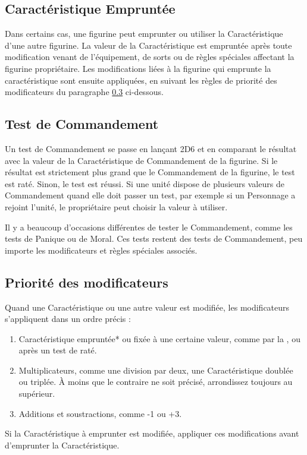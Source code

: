 \subsection{Caractéristique Empruntée}
\label{borrowed_characteristics}

Dans certains cas,  une figurine peut emprunter ou utiliser la Caractéristique d'une autre figurine. La valeur de la Caractéristique est empruntée après toute modification venant de l'équipement, de sorts ou de règles spéciales affectant la figurine propriétaire. Les modifications liées à la figurine qui emprunte la caractéristique sont ensuite appliquées, en suivant les règles de priorité des modificateurs du paragraphe \ref{priority_of_modifiers} ci-dessous.

\subsection{Test de Commandement}

Un test de Commandement se passe en lançant 2D6 et en comparant le résultat avec la valeur de la Caractéristique de Commandement de la figurine. Si le résultat est strictement plus grand que le Commandement de la figurine, le test est raté. Sinon, le test est réussi. Si une unité dispose de plusieurs valeurs de Commandement quand elle doit passer un test, par exemple si un Personnage a rejoint l'unité, le propriétaire peut choisir la valeur à utiliser.

Il y a beaucoup d'occasions différentes de tester le Commandement, comme les tests de Panique ou de Moral. Ces tests restent des tests de Commandement, peu importe les modificateurs et règles spéciales associés.

\newpage
\subsection{Priorité des modificateurs}
\label{priority_of_modifiers}

Quand une Caractéristique ou une autre valeur est modifiée, les modificateurs s'appliquent dans un ordre précis :
\begin{enumerate}
\item Caractéristique empruntée* ou fixée à une certaine valeur, comme par la \inspiringpresence{}, ou après un test de \fear{} raté.
\item Multiplicateurs, comme une division par deux, une Caractéristique doublée ou triplée. À moins que le contraire ne soit précisé, arrondissez toujours au supérieur.
\item Additions et soustractions, comme -1 ou +3.
\end{enumerate}
\noindent * Si la Caractéristique à emprunter est modifiée, appliquer ces modifications avant d'emprunter la Caractéristique. 

